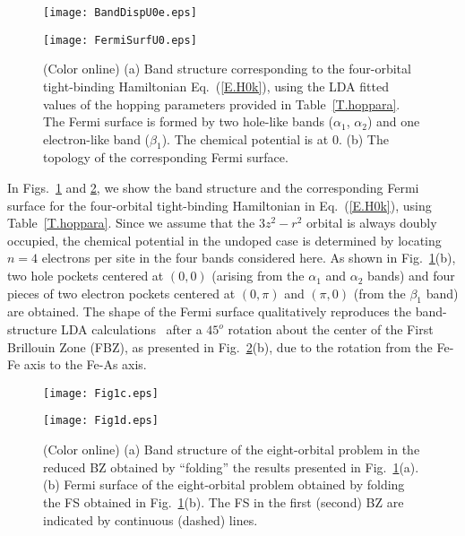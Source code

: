 \documentclass[aps,prb,superscriptaddress,preprintnumbers,
showpacs,legalpaper,twoside,twocolumn,amsmath,amssymb]{revtex4}
\begin{document}
\begin{figure}[h]
\begin{center}
\vskip -0.5cm
\centerline{\texttt{[image: BandDispU0e.eps]}}
\vskip -0.7cm
\centerline{\texttt{[image: FermiSurfU0.eps]}}
\vskip -0.7cm
\caption{(Color online) (a) Band structure corresponding to the four-orbital
tight-binding Hamiltonian Eq.~(\ref{E.H0k}), using the LDA fitted values of the
hopping parameters provided in Table~\ref{T.hoppara}. The Fermi surface
is formed by two hole-like bands ($\alpha_1$, $\alpha_2$) and
one electron-like band ($\beta_1$). The chemical potential is at
 $0$. (b) The topology of the corresponding Fermi surface. }
\label{F.BandU0.0}
\vskip -1.0cm
\end{center}
\end{figure}



In Figs.~\ref{F.BandU0.0} and
\ref{F.Band-bis}, we show the band structure and the
corresponding Fermi surface for the four-orbital tight-binding
Hamiltonian in Eq.~(\ref{E.H0k}), using Table~\ref{T.hoppara}. Since we assume that the
$3z^2-r^2$ orbital is always doubly occupied, the chemical potential
in the undoped case is determined by locating $n=4$ electrons per site in the
four bands considered here. As shown in Fig.~\ref{F.BandU0.0}(b),
two hole pockets centered
at $(0,0)$ (arising from the $\alpha_1$ and $\alpha_2$ bands) and
four pieces of
two electron pockets centered at $(0,\pi)$ and $(\pi,0)$ (from the
$\beta_1$ band) are obtained. The shape of the Fermi surface
qualitatively reproduces the band-structure
LDA calculations~\cite{singh,first, xu, cao, fang2}
after a $45^o$ rotation about the center of the First Brillouin Zone
(FBZ), as presented in Fig.~\ref{F.Band-bis}(b), due to the rotation
from the Fe-Fe axis to the Fe-As axis.

\begin{figure}[h]
\begin{center}
\vskip -0.5cm
\centerline{\texttt{[image: Fig1c.eps]}}
\vskip -1.0cm
\centerline{\texttt{[image: Fig1d.eps]}}
\vskip -0.7cm
\caption{(Color online)
(a) Band structure of the eight-orbital problem in the reduced BZ
obtained by ``folding'' the results presented in Fig.~\ref{F.BandU0.0}(a).
(b) Fermi surface
of the eight-orbital problem obtained by folding the FS obtained in
Fig.~\ref{F.BandU0.0}(b). The FS in
the first (second) BZ are indicated by continuous (dashed) lines.
}
\label{F.Band-bis}
\vskip -1.0cm
\end{center}
\end{figure}
\end{document}
